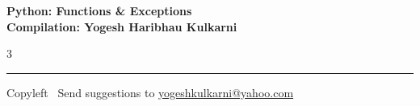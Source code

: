 \documentclass[8pt,landscape]{article}
\begin{document}
\footnotesize


\begin{center}
\Large{\textbf{Python: Functions \& Exceptions\\ Compilation: Yogesh Haribhau Kulkarni}}
\end{center}

\begin{multicols}{3}

\end{multicols}

\rule{\linewidth}{0.25pt}
\scriptsize
Copyleft \textcopyleft\  Send suggestions to
\href{http://www.yogeshkulkarni.com}{yogeshkulkarni@yahoo.com}
\end{document}
